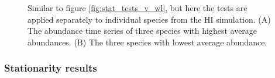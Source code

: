 \begin{figure}[hp]
	\centering
     \caption{Similar to figure \ref{fig:stat_tests_v_wl}, but here the tests are applied separately to individual species from the HI simulation. (A) The abundance time series of three species with highest average abundances. (B) The three species with lowest average abundance.} 
     \label{fig:sp_stat_tests_v_wl}   
\end{figure}

\newpage
\subsubsection{Stationarity results}
\label{sec:ensemble}

